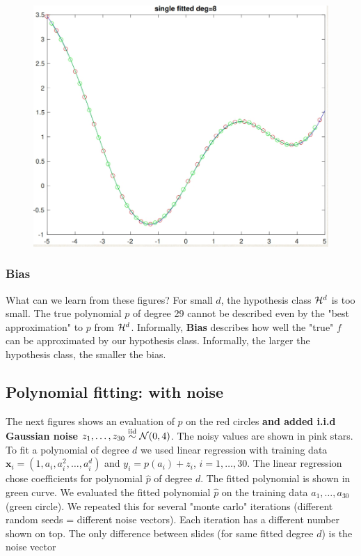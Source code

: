 \begin{figure}[h!]
\centering\includegraphics[scale=0.3]{clean_poly_d_8.png}
\end{figure}

\newpage

\subsubsection{Bias}
 What can we learn from these figures? For small $d$, the hypothesis class $\mathcal{H}^d$ is too small. The true polynomial $p$ of degree 29 cannot be described even by the "best approximation" to $p$
 from $\mathcal{H}^d$. Informally, {\bf Bias} describes how well the "true" $f$ can be approximated by our hypothesis class. Informally, the larger the hypothesis class, the smaller the bias.


\subsection{Polynomial fitting: with noise}
The next figures shows an evaluation of $p$ on the red  circles {\bf and added i.i.d Gaussian noise $z_1,\ldots,z_{30}\stackrel{\text{iid}}{\sim}  \mathcal{N}(0,4)$}. The noisy values are shown in pink stars.
To fit a polynomial of degree $d$ we used linear regression with  training data $\mathbf{x}_i=(1,a_i,a_i^2,\ldots,a_i^d)$ and $y_i=p(a_i)+z_i$, $i=1,\ldots,30$.
The linear regression chose coefficients for polynomial $\hat{p}$ of degree $d$. The fitted polynomial is shown in green curve. We evaluated the fitted polynomial $\hat{p}$ on the training data $a_1,\ldots,a_{30}$ (green circle). We repeated this for several "monte carlo" iterations (different random seeds = different noise vectors). Each iteration has a different number shown on top. The only difference between slides (for same fitted degree $d$) is the noise vector

